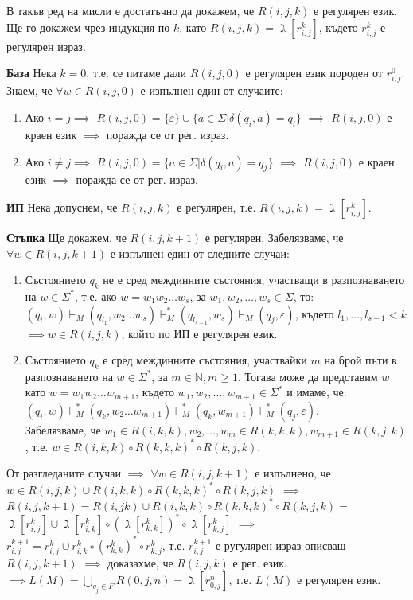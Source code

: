 \documentclass[fleqn,12pt]{article}
\begin{document}
\begin{flushleft}
В такъв ред на мисли е достатъчно да докажем, че $R(i, j, k)$ е регулярен език. Ще го докажем чрез индукция по $k$, като $R(i, j, k) = \gimel[r_{i, j}^k]$, където $r_{i, j}^k$ е регулярен израз.

\textbf{База} Нека $k = 0$, т.е. се питаме дали $R(i, j, 0)$ е регулярен език породен от $r_{i, j}^0$. Знаем, че $\forall w \in R(i, j, 0)$ е изпълнен един от случаите:
\begin{enumerate}
    \item Ако $i = j \implies$ $R(i, j, 0) = \{\varepsilon\} \cup \{a \in \Sigma | \delta(q_i, a) = q_i\}$ $\implies$ $R(i, j, 0)$ е краен език $\implies$ поражда се от рег. израз.
    \item Ако $i \neq j \implies$ $R(i, j, 0) = \{a \in \Sigma | \delta(q_i, a) = q_j\}$ $\implies$ $R(i, j, 0)$ е краен език $\implies$ поражда се от рег. израз.
\end{enumerate}

\textbf{ИП} Нека допуснем, че $R(i, j, k)$ е регулярен, т.е. $R(i, j, k) = \gimel[r_{i, j}^k]$.

\textbf{Стъпка} Ще докажем, че $R(i, j, k+1)$ е регулярен. Забелязваме, че $\forall w \in R(i, j, k+1)$ е изпълнен един от следните случаи:
\begin{enumerate}
    \item Състоянието $q_k$ не е сред междинните състояния, участващи в разпознаването на $w \in \Sigma^*$, т.е. ако $w = w_1w_2{\dots}w_s$, за $w_1, w_2, \dots, w_s \in \Sigma$, то: \\
    $(q_i, w) \vdash_M (q_{l_1}, w_2{\dots}w_s) \vdash_M^* (q_{l_{s-1}}, w_s) \vdash_M (q_j, \varepsilon)$, където ${l_1}, \dots, {l_{s-1}} < k$ $\implies w \in R(i, j, k)$, който по ИП е регулярен език.
    \item Състоянието $q_k$ е сред междинните състояния, участвайки $m$ на брой пъти в разпознаването на $w \in \Sigma^*$, за $m \in \mathbb{N}, m \geq 1$. Тогава може да представим $w$ като $w = w_1w_2{\dots}w_{m+1}$, където $w_1, w_2, \dots, w_{m+1} \in \Sigma^*$ и имаме, че: \\
    $(q_i, w) \vdash_M^* (q_k, w_2{\dots}w_{m+1}) \vdash_M^* (q_k, w_{m+1}) \vdash_M^* (q_j, \varepsilon)$. \\
    Забелязваме, че $w_1 \in R(i, k, k), w_2, \dots, w_m \in R(k, k, k), w_{m+1} \in R(k, j, k)$, т.е. $w \in R(i, k, k) \circ R(k, k, k)^* \circ R(k, j, k)$.
\end{enumerate}

От разгледаните случаи $\implies$ $\forall w \in R(i, j, k+1)$ е изпълнено, че $w \in R(i, j, k) \cup R(i, k, k) \circ R(k, k, k)^* \circ R(k, j, k)$ $\implies$ $R(i, j, k+1) = R(i, j k) \cup R(i, k, k) \circ R(k, k, k)^* \circ R(k, j, k) =$$\gimel[r_{i, j}^k] \cup \gimel[r_{i, k}^k] \circ (\gimel[r_{k, k}^k])^* \circ \gimel[r_{k, j}^k]$ $\implies$ $r_{i, j}^{k+1} = r_{i, j}^k \cup r_{i, k}^{k} \circ (r_{k, k}^{k})^* \circ r_{k, j}^{k}$, т.е. $r_{i, j}^{k+1}$ е ругулярен израз описваш $R(i, j, k+1)$ $\implies$ доказахме, че $R(i, j, k)$ е рег. език. \\
$\implies L(M) = \bigcup\limits_{q_j \in F} R(0, j, n) = \gimel[r_{0, j}^n]$, т.е. $L(M)$ е регулярен език. \square


\end{flushleft}
\end{document}
